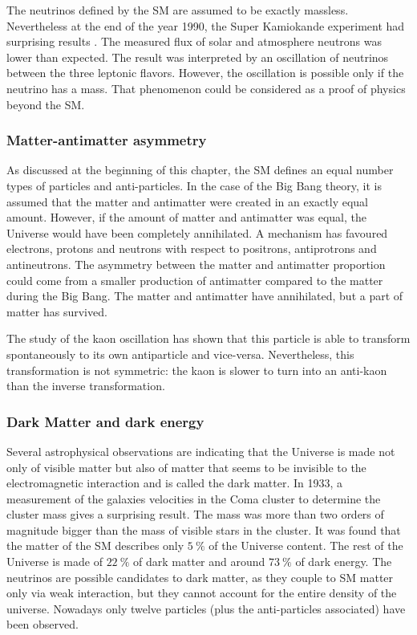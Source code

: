       The neutrinos defined by the \gls{SM} are assumed to be exactly massless.
      Nevertheless at the end of the year 1990, the Super Kamiokande experiment had surprising results \cite{Super-Kamiokande-Oscillation}.
      The measured flux of solar and atmosphere neutrons was lower than expected.
      The result was interpreted by an oscillation of neutrinos between the three leptonic flavors.
      However, the oscillation is possible only if the neutrino has a mass.
      That phenomenon could be considered as a proof of physics beyond the \gls{SM}.

      \subsubsection{Matter-antimatter asymmetry}

      As discussed at the beginning of this chapter, the \gls{SM} defines an equal number types of particles and anti-particles. 
      In the case of the Big Bang theory, it is assumed that the matter and antimatter were created in an exactly equal amount.
      However, if the amount of matter and antimatter was equal, the Universe would have been completely annihilated.
      A mechanism has favoured electrons, protons and neutrons with respect to positrons, antiprotrons and antineutrons.
      The asymmetry between the matter and antimatter proportion could come from a smaller production of antimatter compared to the matter during the Big Bang.
      The matter and antimatter have annihilated, but a part of matter has survived. 

      The study of the kaon oscillation has shown that this particle is able to transform spontaneously to its own antiparticle and vice-versa.
      Nevertheless, this transformation is not symmetric: the kaon is slower to turn into an anti-kaon than the inverse transformation.

      \subsubsection{Dark Matter and dark energy}
      
      Several astrophysical observations are indicating that the Universe is made not only of visible matter but also of matter that seems to be invisible to the electromagnetic interaction and is called the dark matter.
      In 1933, a measurement of the galaxies velocities in the Coma cluster to determine the cluster mass gives a surprising result.
      The mass was more than two orders of magnitude bigger than the mass of visible stars in the cluster.
      It was found that the matter of the \gls{SM} describes only $5~\%$ of the Universe content. 
      The rest of the Universe is made of $22~\%$ of dark matter and around $73~\%$ of dark energy.
      The neutrinos are possible candidates to dark matter, as they couple to \gls{SM} matter only via weak interaction, but they cannot account for the entire density of the universe.
      Nowadays only twelve particles (plus the anti-particles associated) have been observed. 

